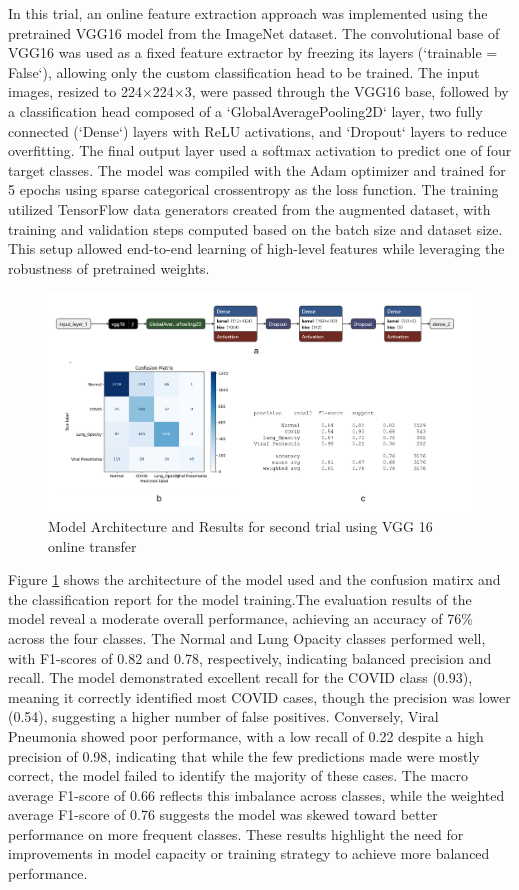 \documentclass{article}
\begin{document}
In this trial, an online feature extraction approach was implemented using the pretrained VGG16 model from the ImageNet dataset. The convolutional base of VGG16 was used as a fixed feature extractor by freezing its layers (`trainable = False`), allowing only the custom classification head to be trained. The input images, resized to 224×224×3, were passed through the VGG16 base, followed by a classification head composed of a `GlobalAveragePooling2D` layer, two fully connected (`Dense`) layers with ReLU activations, and `Dropout` layers to reduce overfitting. The final output layer used a softmax activation to predict one of four target classes. The model was compiled with the Adam optimizer and trained for 5 epochs using sparse categorical crossentropy as the loss function. The training utilized TensorFlow data generators created from the augmented dataset, with training and validation steps computed based on the batch size and dataset size. This setup allowed end-to-end learning of high-level features while leveraging the robustness of pretrained weights.
\begin{figure}[h!] %
    \centering
    \includegraphics[width=1.0\linewidth]{vgg16online1.png}
    \caption{Model Architecture and Results for second trial using VGG 16 online transfer}
    \label{fig:vgg16result1.png}
\end{figure}
Figure \ref{fig:vgg16result1.png} shows the architecture of the model used and the confusion matirx and the classification report for the model training.The evaluation results of the model reveal a moderate overall performance, achieving an accuracy of 76\% across the four classes. The Normal and Lung Opacity classes performed well, with F1-scores of 0.82 and 0.78, respectively, indicating balanced precision and recall. The model demonstrated excellent recall for the COVID class (0.93), meaning it correctly identified most COVID cases, though the precision was lower (0.54), suggesting a higher number of false positives. Conversely, Viral Pneumonia showed poor performance, with a low recall of 0.22 despite a high precision of 0.98, indicating that while the few predictions made were mostly correct, the model failed to identify the majority of these cases. The macro average F1-score of 0.66 reflects this imbalance across classes, while the weighted average F1-score of 0.76 suggests the model was skewed toward better performance on more frequent classes. These results highlight the need for improvements in model capacity or training strategy to achieve more balanced performance.
\end{document}
